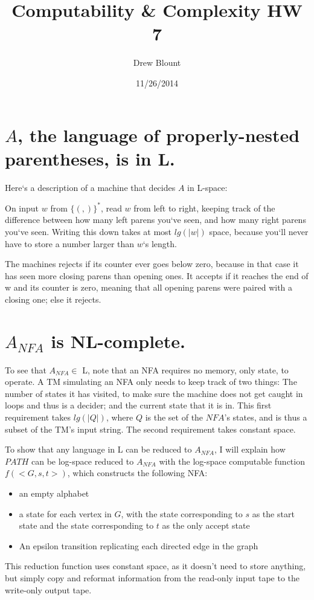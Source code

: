\documentclass[11pt]{article}
\makeatletter
\renewcommand{\maketitle} %
{ \begingroup \vskip 10pt \begin{center} \Huge {\bf \@title}
    \vskip 10pt \large \@author \hskip 20pt \@date \end{center}
  \vskip 10pt \endgroup \setcounter{footnote}{0} }
\renewcommand{\=}[1]{\stackrel{#1}{=}} %
\theoremstyle{definition}
\makeatother
\begin{document}
\title{Computability \& Complexity HW 7}
\author{Drew Blount}
\date{11/26/2014}
\maketitle



\section{ $A$, the language of properly-nested parentheses, is in L.}
Here`s a description of a machine that decides $A$ in L-space: 

On input $w$ from $\{(, )\}^*$, read $w$ from left to right, keeping track of the difference between how many left parens you`ve seen, and how many right parens you`ve seen. Writing this down takes at most $lg(|w|)$ space, because you`ll never have to store a number larger than $w$`s length.

The machines rejects if its counter ever goes below zero, because in that case it has seen more closing parens than opening ones. It accepts if it reaches the end of w and its counter is zero, meaning that all opening parens were paired with a closing one; else it rejects.


\section{$A_{NFA}$ is NL-complete.}
To see that $A_{NFA} \in $ L, note that an NFA requires no memory, only state, to operate. A TM simulating an NFA only needs to keep track of two things: The number of states it has visited, to make sure the machine does not get caught in loops and thus is a decider; and the current state that it is in. This first requirement takes $lg(|Q|)$, where $Q$ is the set of the $NFA$'s states, and is thus a subset of the TM's input string. The second requirement takes constant space.

To show that any language in L can be reduced to $A_{NFA}$, I will explain how $PATH$ can be log-space reduced to $A_{NFA}$ with the log-space computable function $f(<G,s,t>)$, which constructs the following NFA:
\begin{itemize}
\item an empty alphabet
\item a state for each vertex in  $G$, with the state corresponding to $s$ as the start state and the state corresponding to $t$ as the only accept state
\item An epsilon transition replicating each directed edge in the graph
\end{itemize}
This reduction function uses constant space, as it doesn't need to store anything, but simply copy and reformat information from the read-only input tape to the write-only output tape.
\end{document}
